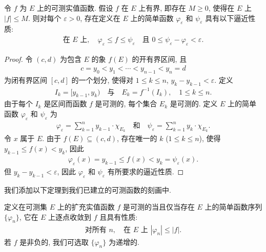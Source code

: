 \documentclass[../../main.tex]{subfiles}
\begin{document}
\begin{lemma}[简单逼近引理]\label{lemma:ch03-简单逼近引理}
令 $f$ 为 $E$ 上的可测实值函数. 假设 $f$ 在 $E$ 上有界, 即存在 $M\geqslant 0$, 使得在 $E$ 上 $|f|\leqslant M$. 则对每个 $\varepsilon>0$, 存在定义在 $E$ 上的简单函数 $\varphi_{\varepsilon}$ 和 $\psi_{\varepsilon}$ 具有以下逼近性质:
\begin{align*}
\text{在 }E\text{ 上},\quad\varphi_{\varepsilon}\leqslant f\leqslant\psi_{\varepsilon}\quad\text{且 }0\leqslant\psi_{\varepsilon}-\varphi_{\varepsilon}<\varepsilon.
\end{align*}
\end{lemma}

\begin{proof}
令 $(c,d)$ 为包含 $E$ 的象 $f(E)$ 的开有界区间, 且
\begin{align*}
c=y_{0}<y_{1}<\cdots<y_{n-1}<y_{n}=d
\end{align*}
为闭有界区间 $[c,d]$ 的一个划分, 使得对 $1\leqslant k\leqslant n$, $y_{k}-y_{k-1}<\varepsilon$. 定义
\begin{align*}
I_{k}=[y_{k-1},y_{k})\quad\text{与}\quad E_{k}=f^{-1}(I_{k}),\quad 1\leqslant k\leqslant n.
\end{align*}
由于每个 $I_{k}$ 是区间而函数 $f$ 是可测的, 每个集合 $E_{k}$ 是可测的. 定义 $E$ 上的简单函数 $\varphi_{\varepsilon}$ 和 $\psi_{\varepsilon}$ 为
\begin{align*}
\varphi_{\varepsilon}=\sum_{k=1}^{n}y_{k-1}\cdot\chi_{E_{k}}\quad\text{和}\quad\psi_{\varepsilon}=\sum_{k=1}^{n}y_{k}\cdot\chi_{E_{k}}.
\end{align*}
令 $x$ 属于 $E$. 由于 $f(E)\subseteq(c,d)$, 存在唯一的 $k$ ($1\leqslant k\leqslant n$), 使得 $y_{k-1}\leqslant f(x)<y_{k}$, 因此
\begin{align*}
\varphi_{\varepsilon}(x)=y_{k-1}\leqslant f(x)<y_{k}=\psi_{\varepsilon}(x).
\end{align*}
但 $y_{k}-y_{k-1}<\varepsilon$, 因此 $\varphi_{\varepsilon}$ 和 $\psi_{\varepsilon}$ 有所要求的逼近性质.
\end{proof}

我们添加以下定理到我们已建立的可测函数的刻画中.

\begin{theorem}[简单逼近定理]\label{theorem:ch03-简单逼近定理}
定义在可测集 $E$ 上的扩充实值函数 $f$ 是可测的当且仅当存在 $E$ 上的简单函数序列 $\{\varphi_{n}\}$, 它在 $E$ 上逐点收敛到 $f$ 且具有性质:
\begin{align*}
\text{对所有 }n,\quad\text{在 }E\text{ 上 }|\varphi_{n}|\leqslant|f|.
\end{align*}
若 $f$ 是非负的, 我们可选取 $\{\varphi_{n}\}$ 为递增的.
\end{theorem}
\end{document}
